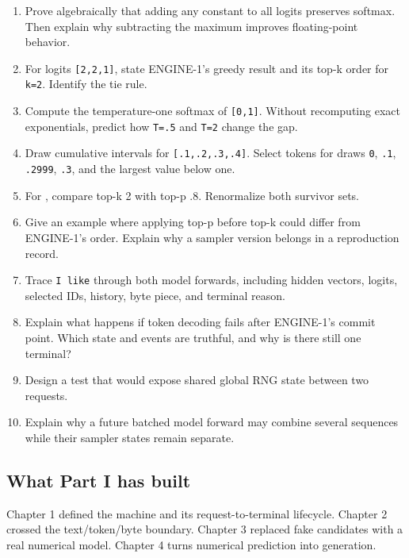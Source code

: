 \documentclass[
  10pt,
]{article}
\providecommand{\tightlist}{%
  \setlength{\itemsep}{0pt}\setlength{\parskip}{0pt}}
\begin{document}
\begin{enumerate}
\def\labelenumi{\arabic{enumi}.}
\tightlist
\item
  Prove algebraically that adding any constant to all logits preserves
  softmax. Then explain why subtracting the maximum improves
  floating-point behavior.
\item
  For logits \texttt{{[}2,2,1{]}}, state ENGINE-1's greedy result and
  its top-k order for \texttt{k=2}. Identify the tie rule.
\item
  Compute the temperature-one softmax of \texttt{{[}0,1{]}}. Without
  recomputing exact exponentials, predict how \texttt{T=.5} and
  \texttt{T=2} change the gap.
\item
  Draw cumulative intervals for \texttt{{[}.1,.2,.3,.4{]}}. Select
  tokens for draws \texttt{0}, \texttt{.1}, \texttt{.2999}, \texttt{.3},
  and the largest value below one.
\item
  For \texttt{\seqsplit{[.40,.30,.15,.10,.05]}}, compare top-k 2 with
  top-p .8. Renormalize both survivor sets.
\item
  Give an example where applying top-p before top-k could differ from
  ENGINE-1's order. Explain why a sampler version belongs in a
  reproduction record.
\item
  Trace \texttt{I\ like} through both model forwards, including hidden
  vectors, logits, selected IDs, history, byte piece, and terminal
  reason.
\item
  Explain what happens if token decoding fails after ENGINE-1's commit
  point. Which state and events are truthful, and why is there still one
  terminal?
\item
  Design a test that would expose shared global RNG state between two
  requests.
\item
  Explain why a future batched model forward may combine several
  sequences while their sampler states remain separate.
\end{enumerate}

\subsection{What Part I has built}\label{what-part-i-has-built}

Chapter 1 defined the machine and its request-to-terminal lifecycle.
Chapter 2 crossed the text/token/byte boundary. Chapter 3 replaced fake
candidates with a real numerical model. Chapter 4 turns numerical
prediction into generation.
\end{document}
